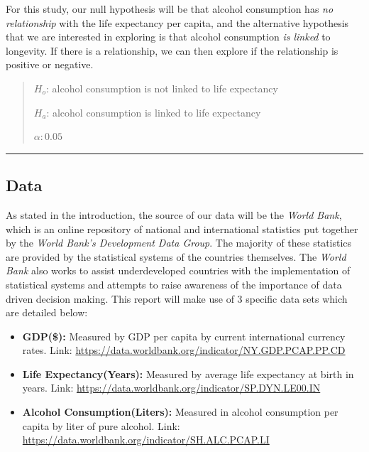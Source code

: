 \documentclass[
]{article}
\begin{document}
For this study, our null hypothesis will be that alcohol consumption has
\emph{no relationship} with the life expectancy per capita, and the
alternative hypothesis that we are interested in exploring is that
alcohol consumption \emph{is linked} to longevity. If there is a
relationship, we can then explore if the relationship is positive or
negative.

\begin{quote}
\(H_{o}\): alcohol consumption is not linked to life expectancy

\(H_{a}\): alcohol consumption is linked to life expectancy

\(\alpha: 0.05\)
\end{quote}

\begin{center}\rule{0.5\linewidth}{0.5pt}\end{center}

\hypertarget{data}{%
\subsection{Data}\label{data}}

As stated in the introduction, the source of our data will be the
\emph{World Bank}, which is an online repository of national and
international statistics put together by the \emph{World Bank's
Development Data Group}. The majority of these statistics are provided
by the statistical systems of the countries themselves. The \emph{World
Bank} also works to assist underdeveloped countries with the
implementation of statistical systems and attempts to raise awareness of
the importance of data driven decision making. This report will make use
of 3 specific data sets which are detailed below:

\begin{itemize}
\item
  \textbf{GDP(\$):} Measured by GDP per capita by current international
  currency rates. Link:
  \url{https://data.worldbank.org/indicator/NY.GDP.PCAP.PP.CD}
\item
  \textbf{Life Expectancy(Years):} Measured by average life expectancy
  at birth in years. Link:
  \url{https://data.worldbank.org/indicator/SP.DYN.LE00.IN}
\item
  \textbf{Alcohol Consumption(Liters):} Measured in alcohol consumption
  per capita by liter of pure alcohol. Link:
  \url{https://data.worldbank.org/indicator/SH.ALC.PCAP.LI}
\end{itemize}
\end{document}
